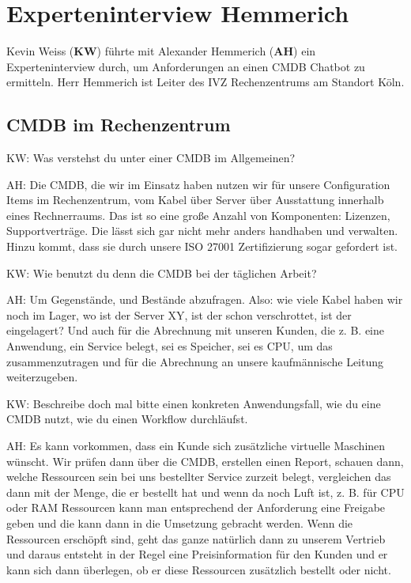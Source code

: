 \chapter{Experteninterview Hemmerich}\label{Interview_Hemmerich}

Kevin Weiss (\textbf{KW}) führte mit Alexander Hemmerich (\textbf{AH}) ein Experteninterview  durch, um Anforderungen an einen CMDB Chatbot zu ermitteln. Herr Hemmerich ist Leiter des IVZ Rechenzentrums am Standort Köln.

\section*{CMDB im Rechenzentrum}

\begin{list}{X:}{\setlength{\labelsep}{5mm}}
\item[KW:] Was verstehst du unter einer CMDB im Allgemeinen?
\item[AH:] Die CMDB, die wir im Einsatz haben nutzen wir für unsere Configuration Items im Rechenzentrum, vom Kabel über Server über Ausstattung innerhalb eines Rechnerraums. Das ist so eine große Anzahl von Komponenten: Lizenzen, Supportverträge. Die lässt sich gar nicht mehr anders handhaben und verwalten. Hinzu kommt, dass sie durch unsere ISO 27001 Zertifizierung sogar gefordert ist.
\item[KW:] Wie benutzt du denn die CMDB bei der täglichen Arbeit?
\item [AH:] Um Gegenstände, und Bestände abzufragen. Also: wie viele Kabel haben wir noch im Lager, wo ist der Server XY, ist der schon verschrottet, ist der eingelagert? Und auch für die Abrechnung mit unseren Kunden, die z. B. eine Anwendung, ein Service belegt, sei es Speicher, sei es CPU, um das zusammenzutragen und für die Abrechnung an unsere kaufmännische Leitung weiterzugeben. 
\item [KW:] Beschreibe doch mal bitte einen konkreten Anwendungsfall, wie du eine CMDB nutzt, wie du einen Workflow durchläufst.
\item [AH:] Es kann vorkommen, dass ein Kunde sich zusätzliche virtuelle Maschinen wünscht. Wir prüfen dann über die CMDB, erstellen einen Report, schauen dann, welche Ressourcen sein bei uns bestellter Service zurzeit belegt, vergleichen das dann mit der Menge, die er bestellt hat und wenn da noch Luft ist, z. B. für CPU oder RAM Ressourcen kann man entsprechend der Anforderung eine Freigabe geben und die kann dann in die Umsetzung gebracht werden. Wenn die Ressourcen erschöpft sind, geht das ganze natürlich dann zu unserem Vertrieb und daraus entsteht in der Regel eine Preisinformation für den Kunden und er kann sich dann überlegen, ob er diese Ressourcen zusätzlich bestellt oder nicht.

\end{list}
